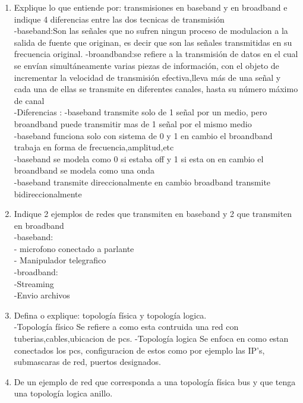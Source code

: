 \documentclass{udparticle}
\begin{document}
\begin{enumerate}
\item Explique lo que entiende por: transmisiones en baseband y en broadband e indique 4 diferencias
entre las dos tecnicas de transmisión\\
    -baseband:Son las señales que no sufren ningun proceso de modulacion a la salida de fuente que originan,
              es decir que son las señales transmitidas en su frecuencia original.
    -broandband:se refiere a la transmisión de datos en el cual se envían simultáneamente varias piezas de información, 
              con el objeto de incrementar la velocidad de transmisión efectiva,lleva más de una señal y cada una de 
              ellas se transmite en diferentes canales, hasta su número máximo de canal\\
    -Diferencias :
        -baseband transmite solo de 1 señal por un medio, pero broandband puede transmitir mas de 1 señal por el mismo medio\\
        -baseband funciona solo con sistema de 0 y 1 en cambio el broandband trabaja en forma de frecuencia,amplitud,etc\\
        -baseband se modela como 0 si estaba off y 1 si esta on en cambio el broandband se modela como una onda\\
        -baseband transmite direccionalmente en cambio broadband transmite bidireccionalmente\\

\item Indique 2 ejemplos de redes que transmiten en baseband y 2 que transmiten en broadband\\
    -baseband:\\
        - microfono conectado a parlante\\
        - Manipulador telegrafico\\
    -broadband:\\
        -Streaming\\
        -Envio archivos\\

\item Defina o explique: topología física y topología logica. \\
    -Topología físico 
        Se refiere a como esta contruida una red con tuberias,cables,ubicacion de pcs.
    -Topología logica
        Se enfoca en como estan conectados los pcs, configuracion de estos como por ejemplo las IP's,
        submascaras de red, puertos designados.
\item De un ejemplo de red que corresponda a una topología física bus y que tenga una topología
logica anillo.\\



\end{enumerate}
\end{document}
